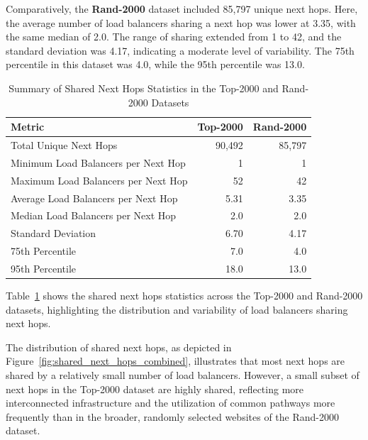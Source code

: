 \documentclass[12pt]{cwru_thesis}
\begin{document}
Comparatively, the \textbf{Rand-2000} dataset included 85,797 unique next hops. Here, the average number of load balancers sharing a next hop was lower at 3.35, with the same median of 2.0. The range of sharing extended from 1 to 42, and the standard deviation was 4.17, indicating a moderate level of variability. The 75th percentile in this dataset was 4.0, while the 95th percentile was 13.0.


\begin{table}[h!]
    \centering
    \begin{tabular}{|l|r|r|}
        \hline
        \textbf{Metric} & \textbf{Top-2000} & \textbf{Rand-2000} \\
        \hline
        Total Unique Next Hops & 90,492 & 85,797 \\
        Minimum Load Balancers per Next Hop & 1 & 1 \\
        Maximum Load Balancers per Next Hop & 52 & 42 \\
        Average Load Balancers per Next Hop & 5.31 & 3.35 \\
        Median Load Balancers per Next Hop & 2.0 & 2.0 \\
        Standard Deviation & 6.70 & 4.17 \\
        75th Percentile & 7.0 & 4.0 \\
        95th Percentile & 18.0 & 13.0 \\
        \hline
    \end{tabular}
    \caption{Summary of Shared Next Hops Statistics in the Top-2000 and Rand-2000 Datasets}
    \label{tab:shared_next_hops_summary}
\end{table}

Table~\ref{tab:shared_next_hops_summary} shows the shared next hops statistics across the Top-2000 and Rand-2000 datasets, highlighting the distribution and variability of load balancers sharing next hops.



The distribution of shared next hops, as depicted in Figure~\ref{fig:shared_next_hops_combined}, illustrates that most next hops are shared by a relatively small number of load balancers. However, a small subset of next hops in the Top-2000 dataset are highly shared, reflecting more interconnected infrastructure and the utilization of common pathways more frequently than in the broader, randomly selected websites of the Rand-2000 dataset.
\end{document}
